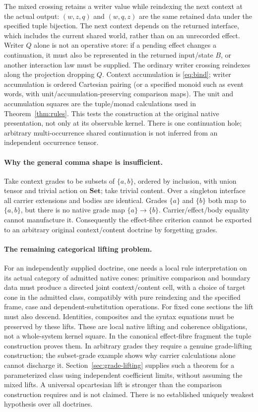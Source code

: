 \documentclass[11pt]{article}
\newcommand{\Set}{\mathbf{Set}}
\begin{document}
The mixed crossing retains a writer value while reindexing the next context at the actual output: $(w,z,q)$ and $(w,q,z)$ are the same retained data under the specified tuple bijection. The next context depends on the returned interface, which includes the current shared world, rather than on an unrecorded effect. Writer $Q$ alone is not an operative store: if a pending effect changes a continuation, it must also be represented in the returned input/state $B$, or another interaction law must be supplied. The ordinary writer crossing reindexes along the projection dropping $Q$. Context accumulation is \eqref{eq:bind}; writer accumulation is ordered Cartesian pairing (or a specified monoid such as event words, with unit/accumulation-preserving comparison maps). The unit and accumulation squares are the tuple/monad calculations used in Theorem~\ref{thm:rules}. This tests the construction at the original native presentation, not only at its observable kernel. There is one continuation hole; arbitrary multi-occurrence shared continuation is not inferred from an independent occurrence tensor.

\paragraph{Why the general comma shape is insufficient.} Take context grades to be subsets of $\{a,b\}$, ordered by inclusion, with union tensor and trivial action on $\Set$; take trivial content. Over a singleton interface all carrier extensions and bodies are identical. Grades $\{a\}$ and $\{b\}$ both map to $\{a,b\}$, but there is no native grade map $\{a\}\to\{b\}$. Carrier/effect/body equality cannot manufacture it. Consequently the effect-fibre criterion cannot be exported to an arbitrary original context/content doctrine by forgetting grades.

\paragraph{The remaining categorical lifting problem.} For an independently supplied doctrine, one needs a local rule interpretation on its actual category of admitted native cones: primitive comparison and boundary data must produce a directed joint context/content cell, with a choice of target cone in the admitted class, compatibly with pure reindexing and the specified frame, case and dependent-substitution operations. For fixed cone sections the lift must also descend. Identities, composites and the syntax equations must be preserved by these lifts. These are local native lifting and coherence obligations, not a whole-system kernel square. In the canonical effect-fibre fragment the tuple construction proves them. In arbitrary grades they require a genuine grade-lifting construction; the subset-grade example shows why carrier calculations alone cannot discharge it. Section~\ref{sec:grade-lifting} supplies such a theorem for a parameterized class using independent coefficient limits, without assuming the mixed lifts. A universal opcartesian lift is stronger than the comparison construction requires and is not claimed. There is no established uniquely weakest hypothesis over all doctrines.
\end{document}
